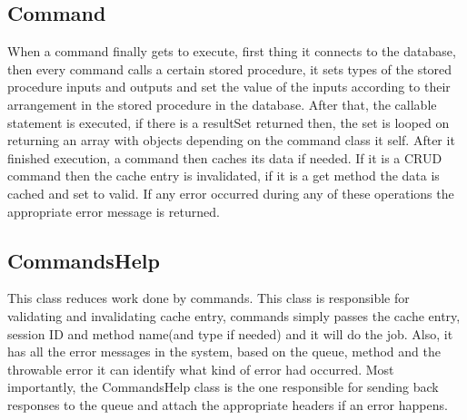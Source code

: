 \documentclass{article}
\begin{document}
\subsection{Command}
When a command finally gets to execute, first thing it connects to the database, then every command calls a certain stored procedure, it sets types of the stored procedure inputs and outputs and set the value of the inputs according to their arrangement in the stored procedure in the database. After that, the callable statement is executed, if there is a resultSet returned then, the set is looped on returning an array with objects depending on the command class it self.
After it finished execution, a command then caches its data if needed. If it is a CRUD command then the cache entry is invalidated, if it is a get method the data is cached and set to valid. If any error occurred during any of these operations the appropriate error message is returned.

\subsection{CommandsHelp}
This class reduces work done by commands. This class is responsible for validating and invalidating cache entry, commands simply passes the cache entry, session ID and method name(and type if needed) and it will do the job. Also, it has all the error messages in the system, based on the queue, method and the throwable error it can identify what kind of error had occurred. Most importantly, the CommandsHelp class is the one responsible for sending back responses to the queue and attach the appropriate headers if an error happens.
\end{document}
